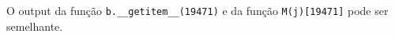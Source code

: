 \documentclass[12pt,varwidth=16cm,border=1pt]{standalone}
\begin{document}
O output da função \verb+b.__getitem__(19471)+ e da função \verb+M(j)[19471]+ pode ser semelhante.

\questiomtrue
\end{document}
